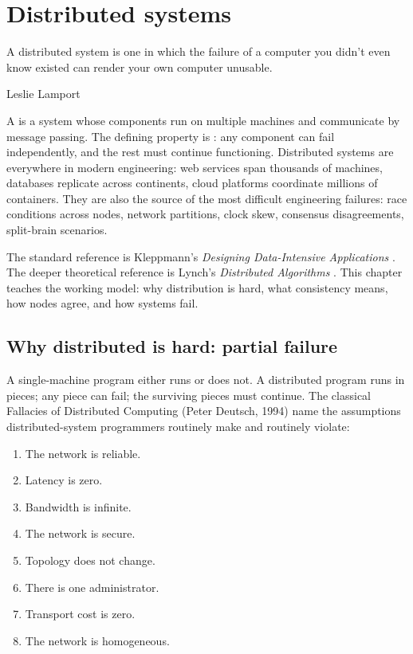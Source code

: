 \chapter{Distributed systems}
\label{vol07:ch11}

\epigraph{A distributed system is one in which the failure of a computer you didn't even know existed can render your own computer unusable.}{Leslie Lamport}


\noindent
A  is a system whose components run on multiple machines and communicate by message passing. The defining property is : any component can fail independently, and the rest must continue functioning. Distributed systems are everywhere in modern engineering: web services span thousands of machines, databases replicate across continents, cloud platforms coordinate millions of containers. They are also the source of the most difficult engineering failures: race conditions across nodes, network partitions, clock skew, consensus disagreements, split-brain scenarios.

The standard reference is Kleppmann's \emph{Designing Data-Intensive Applications} \cite{text:kleppmann-ddia}. The deeper theoretical reference is Lynch's \emph{Distributed Algorithms} \cite{text:lynch-distributed}. This chapter teaches the working model: why distribution is hard, what consistency means, how nodes agree, and how systems fail.

\section{Why distributed is hard: partial failure}

A single-machine program either runs or does not. A distributed program runs in pieces; any piece can fail; the surviving pieces must continue. The classical Fallacies of Distributed Computing (Peter Deutsch, 1994) name the assumptions distributed-system programmers routinely make and routinely violate:

\begin{enumerate}[leftmargin=*]
  \item The network is reliable.
  \item Latency is zero.
  \item Bandwidth is infinite.
  \item The network is secure.
  \item Topology does not change.
  \item There is one administrator.
  \item Transport cost is zero.
  \item The network is homogeneous.
\end{enumerate}

